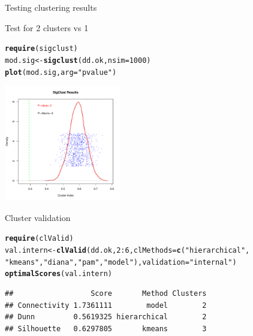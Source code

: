 \documentclass[10pt,xcolor=dvipsnames]{beamer}\usepackage[]{graphicx}\usepackage[]{color}
\makeatletter
\newcommand{\hlnum}[1]{\textcolor[rgb]{0.686,0.059,0.569}{#1}}%
\newcommand{\hlstr}[1]{\textcolor[rgb]{0.192,0.494,0.8}{#1}}%
\newcommand{\hlopt}[1]{\textcolor[rgb]{0,0,0}{#1}}%
\newcommand{\hlstd}[1]{\textcolor[rgb]{0.345,0.345,0.345}{#1}}%
\newcommand{\hlkwb}[1]{\textcolor[rgb]{0.69,0.353,0.396}{#1}}%
\newcommand{\hlkwc}[1]{\textcolor[rgb]{0.333,0.667,0.333}{#1}}%
\newcommand{\hlkwd}[1]{\textcolor[rgb]{0.737,0.353,0.396}{\textbf{#1}}}%
\newenvironment{kframe}{%
 \def\at@end@of@kframe{}%
 \ifinner\ifhmode%
  \def\at@end@of@kframe{\end{minipage}}%
  \begin{minipage}{\columnwidth}%
 \fi\fi%
 \def\FrameCommand##1{\hskip\@totalleftmargin \hskip-\fboxsep
 \colorbox{shadecolor}{##1}\hskip-\fboxsep
     \hskip-\linewidth \hskip-\@totalleftmargin \hskip\columnwidth}%
 \MakeFramed {\advance\hsize-\width
   \@totalleftmargin\z@ \linewidth\hsize
   \@setminipage}}%
 {\par\unskip\endMakeFramed%
 \at@end@of@kframe}
\newenvironment{knitrout}{}{} %
\makeatother
\begin{document}
\begin{frame}{Testing clustering results}

Test for 2 clusters vs 1 

\begin{knitrout}\footnotesize
{}\color{fgcolor}\begin{kframe}
\begin{alltt}
\hlkwd{require}\hlstd{(sigclust)}
\hlstd{mod.sig} \hlkwb{<-}\hlkwd{sigclust}\hlstd{(dd.ok,} \hlkwc{nsim}\hlstd{=}\hlnum{1000}\hlstd{)}
\hlkwd{plot}\hlstd{(mod.sig,} \hlkwc{arg}\hlstd{=}\hlstr{"pvalue"}\hlstd{)}
\end{alltt}
\end{kframe}

{\centering \includegraphics[width=2in]{figure/plotTest-1} 

}



\end{knitrout}

\end{frame}


\begin{frame}{Cluster validation}
\begin{knitrout}\footnotesize
{}\color{fgcolor}\begin{kframe}
\begin{alltt}
\hlkwd{require}\hlstd{(clValid)}
\hlstd{val.intern} \hlkwb{<-} \hlkwd{clValid}\hlstd{(dd.ok,} \hlnum{2}\hlopt{:}\hlnum{6}\hlstd{,} \hlkwc{clMethods} \hlstd{=} \hlkwd{c}\hlstd{(}\hlstr{"hierarchical"}\hlstd{,}
 \hlstr{"kmeans"}\hlstd{,} \hlstr{"diana"}\hlstd{,} \hlstr{"pam"}\hlstd{,}  \hlstr{"model"}\hlstd{),} \hlkwc{validation} \hlstd{=} \hlstr{"internal"}\hlstd{)}
\hlkwd{optimalScores}\hlstd{(val.intern)}
\end{alltt}
\begin{verbatim}
##                  Score       Method Clusters
## Connectivity 1.7361111        model        2
## Dunn         0.5619325 hierarchical        2
## Silhouette   0.6297805       kmeans        3
\end{verbatim}
\end{kframe}
\end{knitrout}
\end{frame}
\end{document}
